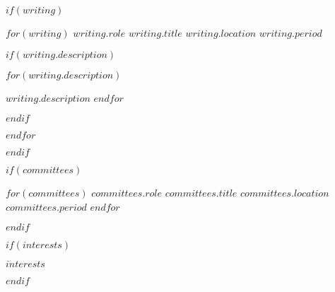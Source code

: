 \documentclass[11pt, a4paper]{awesome-cv}
\begin{document}
$if(writing)$
  \begin{cventries}
    $for(writing)$
      \cventry
      {$writing.role$}
      {$writing.title$}
      {$writing.location$}
      {$writing.period$}
      {
        $if(writing.description)$
          \begin{cvitems}
            $for(writing.description)$
              \item{$writing.description$}
            $endfor$
          \end{cvitems}
        $endif$
      }
    $endfor$
  \end{cventries}
$endif$

$if(committees)$
  \begin{cvhonors}
    $for(committees)$
      \cvhonor
      {$committees.role$}
      {$committees.title$}
      {$committees.location$}
      {$committees.period$}
    $endfor$
  \end{cvhonors}
$endif$

$if(interests)$
  \begin{cvparagraph}

    $interests$
  \end{cvparagraph}
$endif$
\end{document}
